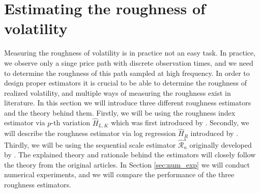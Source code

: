 \documentclass{article}
\begin{document}
\section{Estimating the roughness of volatility} \label{sec:intro_est}
Measuring the roughness of volatility is in practice not an easy task. 
In practice, we observe only a singe price path with discrete observation times, and we need to determine the roughness of this path sampled at high frequency. In order to design proper estimators it is crucial to be able to determine the roughness of realized volatility, and multiple ways of measuring the roughness exist in literature. In this section we will introduce three different roughness estimators and the theory behind them. Firstly, we will be using the roughness index estimator via $p$-th variation $\widehat{H}_{L,K}$ which was first introduced by \cite{cont}. Secondly, we will describe the roughness estimator via log regression $\widehat{H}_{R}$ introduced by \cite{gatheral}. Thirdly, we will be using the sequential scale estimator $\widehat{\mathscr{R}}_n^s$ originally developed by \cite{han}. The explained theory and rationale behind the estimators will closely follow the theory from the original articles. In Section \ref{sec:num_exp} we will conduct numerical experiments, and we will compare the performance of the three roughness estimators. 
\end{document}
